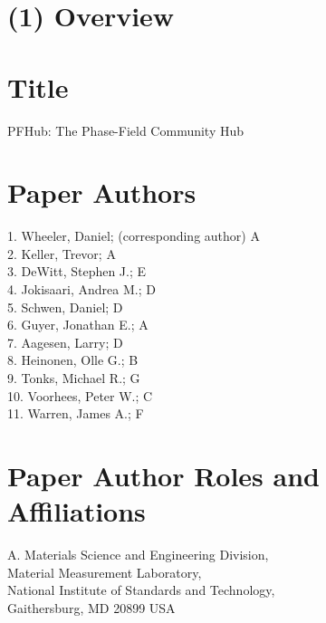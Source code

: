 \documentclass{jors}
\begin{document}
\newcommand\githublink[1]{\href{https://github.com/#1/}{\texttt{\textbf{@#1}}}}




\section*{(1) Overview}

\vspace{0.5cm}

\section*{Title}
\par\bigskip
PFHub: The Phase-Field Community Hub\\[\baselineskip]

\section*{Paper Authors}

1. Wheeler, Daniel; (corresponding author) A\\
2. Keller, Trevor; A\\
3. DeWitt, Stephen J.; E\\
4. Jokisaari, Andrea M.; D\\
5. Schwen, Daniel; D\\
6. Guyer, Jonathan E.; A\\
7. Aagesen, Larry; D\\
8. Heinonen, Olle G.; B\\
9. Tonks, Michael R.; G\\
10. Voorhees, Peter W.; C\\
11. Warren, James A.; F

\section*{Paper Author Roles and Affiliations}

A. Materials Science and Engineering Division, \\
Material Measurement Laboratory, \\
National Institute of Standards and Technology,\\
Gaithersburg, MD 20899 USA
\end{document}
